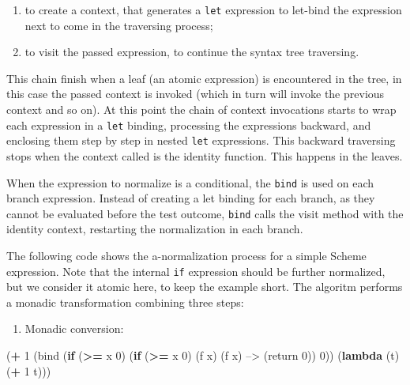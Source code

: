 \documentclass[12pt,a4paper,oneside,openright]{book}
\newenvironment{Shaded}{\begin{snugshade}}{\end{snugshade}}
\newcommand{\KeywordTok}[1]{\textcolor[rgb]{0.13,0.29,0.53}{\textbf{{#1}}}}
\newcommand{\DecValTok}[1]{\textcolor[rgb]{0.00,0.00,0.81}{{#1}}}
\newcommand{\NormalTok}[1]{{#1}}
\providecommand{\tightlist}{%
  \setlength{\itemsep}{0pt}\setlength{\parskip}{0pt}}
\begin{document}
\begin{enumerate}
\def\labelenumi{\arabic{enumi}.}
\tightlist
\item
  to create a context, that generates a \texttt{let} expression to
  let-bind the expression next to come in the traversing process;
\item
  to visit the passed expression, to continue the syntax tree
  traversing.
\end{enumerate}

This chain finish when a leaf (an atomic expression) is encountered in
the tree, in this case the passed context is invoked (which in turn will
invoke the previous context and so on). At this point the chain of
context invocations starts to wrap each expression in a \texttt{let}
binding, processing the expressions backward, and enclosing them step by
step in nested \texttt{let} expressions. This backward traversing stops
when the context called is the identity function. This happens in the
leaves.

When the expression to normalize is a conditional, the \texttt{bind} is
used on each branch expression. Instead of creating a let binding for
each branch, as they cannot be evaluated before the test outcome,
\texttt{bind} calls the visit method with the identity context,
restarting the normalization in each branch.

The following code shows the a-normalization process for a simple Scheme
expression. Note that the internal \texttt{if} expression should be
further normalized, but we consider it atomic here, to keep the example
short. The algoritm performs a monadic transformation combining three
steps:

\begin{enumerate}
\def\labelenumi{\arabic{enumi}.}
\tightlist
\item
  Monadic conversion:
\end{enumerate}

\begin{Shaded}
\begin{Highlighting}[]
   \NormalTok{(}\KeywordTok{+} \DecValTok{1}                             \NormalTok{(bind (}\KeywordTok{if} \NormalTok{(}\KeywordTok{>=} \NormalTok{x }\DecValTok{0}\NormalTok{)}
      \NormalTok{(}\KeywordTok{if} \NormalTok{(}\KeywordTok{>=} \NormalTok{x }\DecValTok{0}\NormalTok{)                            (f x)}
          \NormalTok{(f x)             -->               (return }\DecValTok{0}\NormalTok{))}
          \DecValTok{0}\NormalTok{))                             (}\KeywordTok{lambda} \NormalTok{(t) (}\KeywordTok{+} \DecValTok{1} \NormalTok{t)))}
\end{Highlighting}
\end{Shaded}
\end{document}
